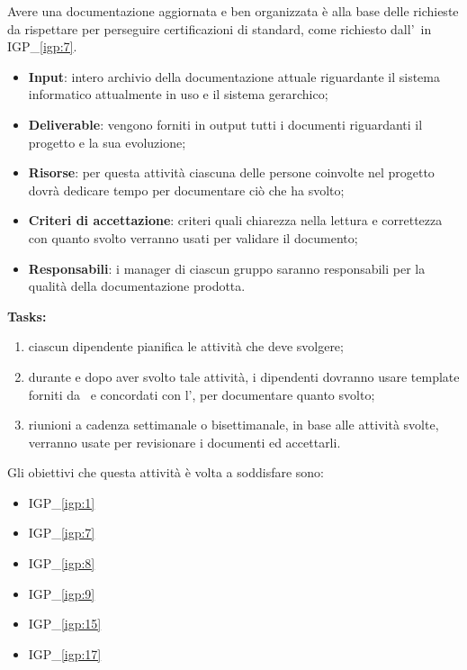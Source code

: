 		Avere una documentazione aggiornata e ben organizzata è alla base delle richieste da rispettare per perseguire certificazioni di standard, come richiesto dall'\istituto~in {\color{pantone}IGP\_\ref{igp:7}}.
		
		\begin{itemize}[noitemsep]
			\renewcommand\labelitemi{--}
			\item \textbf{Input}: intero archivio della documentazione attuale riguardante il sistema informatico attualmente in uso e il sistema gerarchico;
			\item \textbf{Deliverable}: vengono forniti in output tutti i documenti riguardanti il progetto e la sua evoluzione;
			\item \textbf{Risorse}: per questa attività ciascuna delle persone coinvolte nel progetto dovrà dedicare tempo per documentare ciò che ha svolto;
			\item \textbf{Criteri di accettazione}: criteri quali chiarezza nella lettura e correttezza con quanto svolto verranno usati per validare il documento;
			\item \textbf{Responsabili}: i manager di ciascun gruppo saranno responsabili per la qualità della documentazione prodotta.
		\end{itemize}
		
		\textbf{Tasks:}
		\begin{enumerate}[noitemsep]
			\item ciascun dipendente pianifica le attività che deve svolgere;
			\item durante e dopo aver svolto tale attività, i dipendenti dovranno usare template forniti da \azienda~e concordati con l'\istituto, per documentare quanto svolto;
			\item riunioni a cadenza settimanale o bisettimanale, in base alle attività svolte, verranno usate per revisionare i documenti ed accettarli.
		\end{enumerate}
	
		Gli obiettivi che questa attività è volta a soddisfare sono:
		\begin{itemize}[noitemsep]
			\renewcommand\labelitemi{--}
			\item {\color{pantone}IGP\_\ref{igp:1}}
			\item {\color{pantone}IGP\_\ref{igp:7}}
			\item {\color{pantone}IGP\_\ref{igp:8}}
			\item {\color{pantone}IGP\_\ref{igp:9}}
			\item {\color{pantone}IGP\_\ref{igp:15}}
			\item {\color{pantone}IGP\_\ref{igp:17}}
		\end{itemize}

